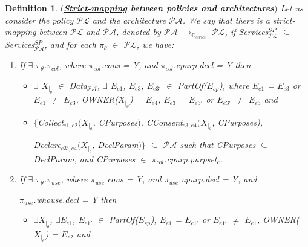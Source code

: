 \documentclass[a4paper]{article}
\newtheorem{ttd}{Definition}
\begin{document}
\begin{ttd} $($\textbf{\underline{Strict-mapping} between policies and architectures}$)$
\label{map}    
\noindent Let us consider the policy $\mathcal{P}\mathcal{L}$ and the architecture $\mathcal{P}\mathcal{A}$. We say that there is a strict-mapping between $\mathcal{P}\mathcal{L}$ and $\mathcal{P}\mathcal{A}$, denoted by $\mathcal{P}\mathcal{A}$ $\rightarrow_{\mathbb{C}_{strict}}$ $\mathcal{P}\mathcal{L}$, if \textit{Services}$^{SP}_{\mathcal{P}\mathcal{L}}$ $\subseteq$ \textit{Services}$^{SP}_{\mathcal{P}\mathcal{A}}$, and for each $\pi_{\theta}$ $\in$ $\mathcal{P}\mathcal{L}$, we have:

\begin{enumerate} 

\item If $\exists$ $\pi_{\theta}$.$\pi_{col}$, where $\pi_{col}$.\textit{cons} = Y, and $\pi_{col}$.\textit{cpurp}.\textit{decl} = Y then
\begin{itemize} 
\item $\exists$ $X_{|_{\theta}}$ $\in$ \textit{Data}$_{\mathcal{P}\mathcal{A}}$, $\exists$ $E_{e1}$,  $E_{e3}$, $E_{e3'}$ $\in$ \textit{PartOf}($E_{sp}$), where  $E_{e1}$ = $E_{e3}$ or $E_{e1}$ $\neq$ $E_{e3}$, OWNER($X_{|_{\theta}}$) = $E_{e4}$, $E_{e3}$ = $E_{e3'}$ or $E_{e3'}$ $\neq$ $E_{e3}$ and 

\item $\{$\textit{Collect}$_{e1,e2}$$(X_{|_{\theta}}$, \textit{CPurposes}$)$, \textit{CConsent}$_{e3,e4}$$(X_{|_{\theta}}$, \textit{CPurposes}), 

\textit{Declare}$_{e3',e4}$$(X_{|_{\theta}}$, \textit{DeclParam}$)\}$ $\subseteq$ $\mathcal{P}\mathcal{A}$ such that \textit{CPurposes} $\subseteq$ \textit{DeclParam}, and \textit{CPurposes} $\in$  $\pi_{col}$.\textit{cpurp}.\textit{purpset}$_c$.   
\end{itemize}

\item If $\exists$ $\pi_{\theta}$.$\pi_{use}$, where $\pi_{use}$.\textit{cons} = Y, 
 and $\pi_{use}$.\textit{upurp}.\textit{decl} = Y,  and 
 
 $\pi_{use}$.\textit{whouse}.\textit{decl} = Y then 
 
\begin{itemize} 
\item $\exists$$X_{|_{\theta}}$, $\exists$$E_{e1}$, $E_{e1'}$ $\in$ \textit{PartOf}($E_{sp}$), $E_{e1}$ = $E_{e1'}$ or $E_{e1'}$ $\neq$ $E_{e1}$, OWNER($X_{|_{\theta}}$) = $E_{e2}$ and 


\end{itemize}
\end{enumerate}
\end{ttd}
\end{document}
